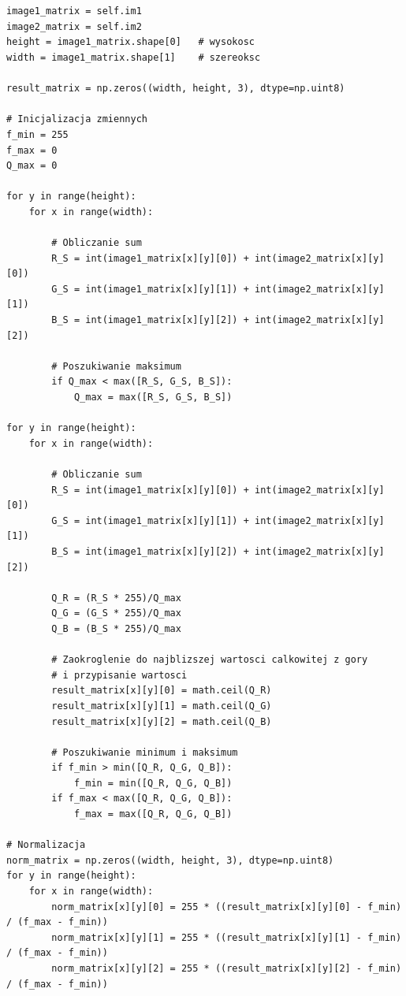 \documentclass[final,a4paper,openany,12pt]{mwbk}
\begin{document}
\begin{lstlisting}[caption= Dzielenie obrazu barwowego przez inny obraz]


image1_matrix = self.im1
image2_matrix = self.im2
height = image1_matrix.shape[0]   # wysokosc
width = image1_matrix.shape[1]    # szereoksc

result_matrix = np.zeros((width, height, 3), dtype=np.uint8)

# Inicjalizacja zmiennych
f_min = 255
f_max = 0
Q_max = 0

for y in range(height):
    for x in range(width):  

        # Obliczanie sum
        R_S = int(image1_matrix[x][y][0]) + int(image2_matrix[x][y][0])
        G_S = int(image1_matrix[x][y][1]) + int(image2_matrix[x][y][1])
        B_S = int(image1_matrix[x][y][2]) + int(image2_matrix[x][y][2])

        # Poszukiwanie maksimum
        if Q_max < max([R_S, G_S, B_S]):
            Q_max = max([R_S, G_S, B_S])

for y in range(height):
    for x in range(width):  

        # Obliczanie sum
        R_S = int(image1_matrix[x][y][0]) + int(image2_matrix[x][y][0])
        G_S = int(image1_matrix[x][y][1]) + int(image2_matrix[x][y][1])
        B_S = int(image1_matrix[x][y][2]) + int(image2_matrix[x][y][2])

        Q_R = (R_S * 255)/Q_max
        Q_G = (G_S * 255)/Q_max
        Q_B = (B_S * 255)/Q_max

        # Zaokroglenie do najblizszej wartosci calkowitej z gory
        # i przypisanie wartosci
        result_matrix[x][y][0] = math.ceil(Q_R)
        result_matrix[x][y][1] = math.ceil(Q_G)
        result_matrix[x][y][2] = math.ceil(Q_B)

        # Poszukiwanie minimum i maksimum                
        if f_min > min([Q_R, Q_G, Q_B]):
            f_min = min([Q_R, Q_G, Q_B])
        if f_max < max([Q_R, Q_G, Q_B]):
            f_max = max([Q_R, Q_G, Q_B])

# Normalizacja
norm_matrix = np.zeros((width, height, 3), dtype=np.uint8)
for y in range(height):
    for x in range(width):
        norm_matrix[x][y][0] = 255 * ((result_matrix[x][y][0] - f_min) / (f_max - f_min))
        norm_matrix[x][y][1] = 255 * ((result_matrix[x][y][1] - f_min) / (f_max - f_min))
        norm_matrix[x][y][2] = 255 * ((result_matrix[x][y][2] - f_min) / (f_max - f_min))

\end{lstlisting}
\end{document}
